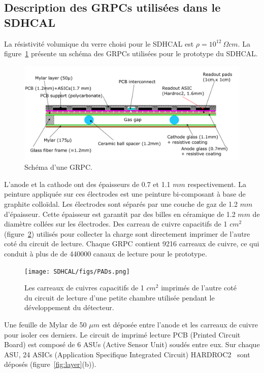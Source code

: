 \subsection{Description des GRPCs utilisées dans le SDHCAL}
La résistivité volumique du verre choisi pour le SDHCAL est $\rho=10^{12}~\Omega cm$. La figure~\ref{fig:grpc} présente un schéma des GRPCs utilisées pour le prototype du SDHCAL. 
\begin{figure}[!h]
  \begin{center}
    \includegraphics[width=.8\textwidth]{SDHCAL/figs/GRPC-K7.png}
    \caption{Schéma d'une GRPC.}
    \label{fig:grpc}
  \end{center}
\end{figure}
L'anode et la cathode ont des épaisseurs de 0.7 et 1.1 $mm$ respectivement. La peinture appliquée sur ces électrodes est une peinture bi-composant à base de graphite colloïdal. Les électrodes sont séparés par une couche de gaz de 1.2 $mm$ d'épaisseur. Cette épaisseur est garantit par des billes en céramique de 1.2 $mm$ de diamètre collées sur les électrodes. Des carreau de cuivre capacitifs de 1 $cm^2$ (figure~\ref{fig:carreaux}) utilisés pour collecter la charge sont directement imprimer de l'autre coté du circuit de lecture. Chaque GRPC contient 9216 carreaux de cuivre, ce qui conduit à plus de de 440000 canaux de lecture pour le prototype.
\begin{figure}[!h]
  \begin{center}
    \texttt{[image: SDHCAL/figs/PADs.png]}
    \caption{Les carreaux de cuivres capacitifs de 1 $cm^2$ imprimés de l'autre coté du circuit de lecture d'une petite chambre utilisée pendant le développement du détecteur.}
    \label{fig:carreaux}
  \end{center}
\end{figure}
Une feuille de Mylar de 50 $\mu m$ est déposée entre l'anode et les carreaux de cuivre pour isoler ces derniers. Le circuit de imprimé lecture PCB (Printed Circuit Board) est composé de 6 ASUs (Active Sensor Unit) soudés entre eux. Sur chaque ASU, 24 ASICs (Application Specifique Integrated Circuit) HARDROC2~\cite{omega} sont déposés (figure~\ref{fig:layer}(b)). 

